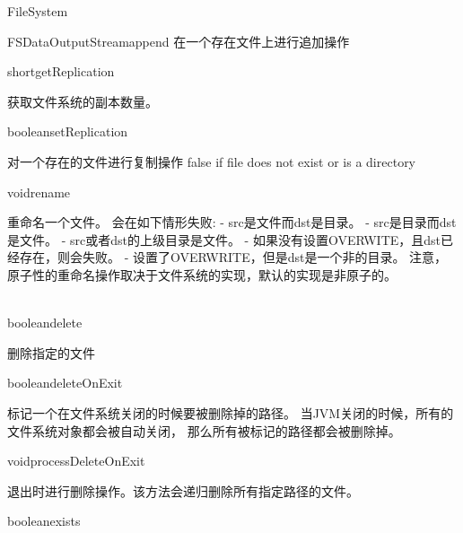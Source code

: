\begin{XeClass}{FileSystem}
\begin{XeMethod}{\XePublic}{FSDataOutputStream}{append}
 在一个存在文件上进行追加操作

    \end{XeMethod}

    \begin{XeMethod}{\XePublic}{short}{getReplication}
         
 获取文件系统的副本数量。

    \end{XeMethod}

    \begin{XeMethod}{\XePublic}{boolean}{setReplication}
         
 对一个存在的文件进行复制操作
 false if file does not exist or is a directory

    \end{XeMethod}

    \begin{XeMethod}{\XeProtected}{void}{rename}
         
 重命名一个文件。
 会在如下情形失败:
 - src是文件而dst是目录。
 - src是目录而dst是文件。
 - src或者dst的上级目录是文件。
 - 如果没有设置OVERWITE，且dst已经存在，则会失败。
 - 设置了OVERWRITE，但是dst是一个非的目录。
 注意，原子性的重命名操作取决于文件系统的实现，默认的实现是非原子的。

    \end{XeMethod}

    \begin{XeMethod}{\XePublic \\ \XeAbstract}{boolean}{delete}
         
 删除指定的文件

    \end{XeMethod}

    \begin{XeMethod}{\XePublic}{boolean}{deleteOnExit}
         
 标记一个在文件系统关闭的时候要被删除掉的路径。
 当JVM关闭的时候，所有的文件系统对象都会被自动关闭，
 那么所有被标记的路径都会被删除掉。

    \end{XeMethod}

    \begin{XeMethod}{\XeProtected}{void}{processDeleteOnExit}
         
 退出时进行删除操作。该方法会递归删除所有指定路径的文件。

    \end{XeMethod}

    \begin{XeMethod}{\XePublic}{boolean}{exists}
         

\end{XeMethod}
\end{XeClass}
